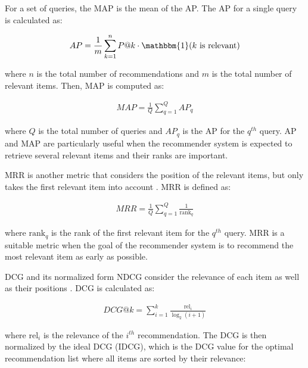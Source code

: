For a set of queries, the \ac{MAP} is the mean of the \ac{AP}. The \ac{AP} for a single query is calculated as:

\begin{align}
    AP = \frac{1}{m} \sum_{k=1}^{n} P@k \cdot \mathbbm{1}(k \text{ is relevant}) \label{eq:average-precision}
\end{align}

where $n$ is the total number of recommendations and $m$ is the total number of relevant items. Then, \ac{MAP} is computed as:

\begin{align}
    MAP = \frac{1}{Q} \sum_{q=1}^{Q} AP_q \label{eq:mean-average-precision}
\end{align}

where $Q$ is the total number of queries and $AP_q$ is the \ac{AP} for the $q^{th}$ query. \ac{AP} and \ac{MAP} are particularly useful when the recommender system is expected to retrieve several relevant items and their ranks are important.

\ac{MRR} is another metric that considers the position of the relevant items, but only takes the first relevant item into account \cite{WikipediacontributorsMeanReciprocal2022,TaifiMRRVs2020,BaiScientificPaper2020}. \ac{MRR} is defined as:

\begin{align}
    MRR = \frac{1}{Q} \sum_{q=1}^{Q} \frac{1}{\text{rank}_q} \label{eq:mean-reciprocal-rank}
\end{align}

where $\text{rank}_q$ is the rank of the first relevant item for the $q^{th}$ query. \ac{MRR} is a suitable metric when the goal of the recommender system is to recommend the most relevant item as early as possible.

\ac{DCG} and its normalized form \ac{NDCG} consider the relevance of each item as well as their positions \cite{WikipediacontributorsDiscountedCumulative2022,TaifiMRRVs2020,BaiScientificPaper2020}. \ac{DCG} is calculated as:

\begin{align}
    DCG@k = \sum_{i=1}^{k} \frac{\text{rel}_i}{\log_2(i+1)} \label{eq:discounted-cumulative-gain}
\end{align}

where $\text{rel}_i$ is the relevance of the $i^{th}$ recommendation. The \ac{DCG} is then normalized by the ideal \ac{DCG} (IDCG), which is the \ac{DCG} value for the optimal recommendation list where all items are sorted by their relevance:

